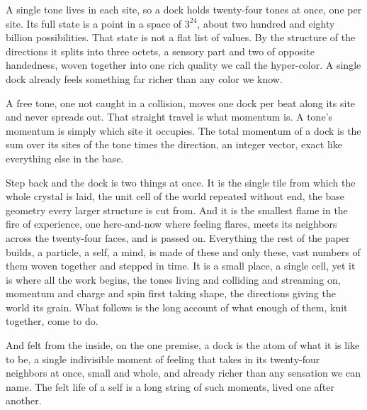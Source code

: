 A single tone lives in each site, so a dock holds twenty-four tones at once, one per site. Its full state is a point in a space of $3^{24}$, about two hundred and eighty billion possibilities. That state is not a flat list of values. By the structure of the directions it splits into three octets, a sensory part and two of opposite handedness, woven together into one rich quality we call the hyper-color. A single dock already feels something far richer than any color we know.

A free tone, one not caught in a collision, moves one dock per beat along its site and never spreads out. That straight travel is what momentum is. A tone's momentum is simply which site it occupies. The total momentum of a dock is the sum over its sites of the tone times the direction, an integer vector, exact like everything else in the base.

Step back and the dock is two things at once. It is the single tile from which the whole crystal is laid, the unit cell of the world repeated without end, the base geometry every larger structure is cut from. And it is the smallest flame in the fire of experience, one here-and-now where feeling flares, meets its neighbors across the twenty-four faces, and is passed on. Everything the rest of the paper builds, a particle, a self, a mind, is made of these and only these, vast numbers of them woven together and stepped in time. It is a small place, a single cell, yet it is where all the work begins, the tones living and colliding and streaming on, momentum and charge and spin first taking shape, the directions giving the world its grain. What follows is the long account of what enough of them, knit together, come to do.

And felt from the inside, on the one premise, a dock is the atom of what it is like to be, a single indivisible moment of feeling that takes in its twenty-four neighbors at once, small and whole, and already richer than any sensation we can name. The felt life of a self is a long string of such moments, lived one after another.
